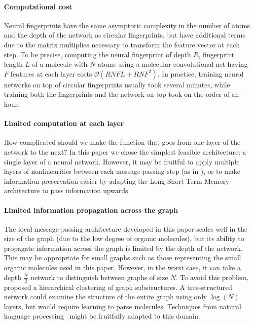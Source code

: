 \documentclass{article}
\begin{document}
\paragraph{Computational cost}
Neural fingerprints have the same asymptotic complexity in the number of atoms and the depth of the network as circular fingerprints, but have additional terms due to the matrix multiplies necessary to transform the feature vector at each step.
To be precise, computing the neural fingerprint of depth $R$, fingerprint length $L$ of a molecule with $N$ atoms using a molecular convolutional net having $F$ features at each layer costs $\mathcal{O}(RNFL + RNF^2)$.
In practice, training neural networks on top of circular fingerprints usually took several minutes, while training both the fingerprints and the network on top took on the order of an hour.

\paragraph{Limited computation at each layer}
How complicated should we make the function that goes from one layer of the network to the next?
In this paper we chose the simplest feasible architecture: a single layer of a neural network.
However, it may be fruitful to apply multiple layers of nonlinearities between each message-passing step (as in \cite{graphnn2009}), or to make information preservation easier by adapting the Long Short-Term Memory~\citep{hochreiter1997long} architecture to pass information upwards.

\paragraph{Limited information propagation across the graph}
The local message-passing architecture developed in this paper scales well in the size of the graph (due to the low degree of organic molecules), but its ability to propagate information across the graph is limited by the depth of the network.
This may be appropriate for small graphs such as those representing the small organic molecules used in this paper.
However, in the worst case, it can take a depth $\frac{N}{2}$ network to distinguish between graphs of size $N$.
To avoid this problem, \citet{bruna2013spectral} proposed a hierarchical clustering of graph substructures.
A tree-structured network could examine the structure of the entire graph using only $\log(N)$ layers, but would require learning to parse molecules.
Techniques from natural language processing~\citep{tai2015improved} might be fruitfully adapted to this domain.
\end{document}
